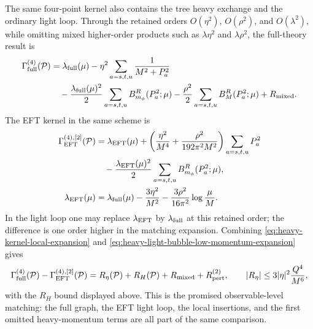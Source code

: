 The same four-point kernel also contains the tree heavy exchange and the
ordinary light loop.  Through the retained orders
\(O(\eta^2)\), \(O(\rho^2)\), and \(O(\lambda^2)\), while omitting mixed
higher-order products such as \(\lambda\eta^2\) and \(\lambda\rho^2\), the
full-theory result is
\begin{equation}
\begin{aligned}
  \Gamma_{\rm full}^{(4)}(\mathcal P)
  &=
  \lambda_{\rm full}(\mu)
  -
  \eta^2\sum_{a=s,t,u}\frac{1}{M^2+P_a^2}
  \\
  &\quad
  -
  \frac{\lambda_{\rm full}(\mu)^2}{2}
  \sum_{a=s,t,u}B_{m_\phi}^R(P_a^2;\mu)
  -
  \frac{\rho^2}{2}
  \sum_{a=s,t,u}B_M^R(P_a^2;\mu)
  +
  R_{\rm mixed}.
\end{aligned}
  \label{eq:heavy-light-full-four-point-kernel}
\end{equation}
The EFT kernel in the same scheme is
\begin{equation}
\begin{aligned}
  \Gamma_{\rm EFT}^{(4),[2]}(\mathcal P)
  &=
  \lambda_{\rm EFT}(\mu)
  +
  \left(
    \frac{\eta^2}{M^4}
    +
    \frac{\rho^2}{192\pi^2M^2}
  \right)
  \sum_{a=s,t,u}P_a^2
  \\
  &\quad
  -
  \frac{\lambda_{\rm EFT}(\mu)^2}{2}
  \sum_{a=s,t,u}B_{m_\phi}^R(P_a^2;\mu),
  \\
  \lambda_{\rm EFT}(\mu)
  &=
  \lambda_{\rm full}(\mu)
  -
  \frac{3\eta^2}{M^2}
  -
  \frac{3\rho^2}{16\pi^2}\log\frac{\mu}{M}.
\end{aligned}
  \label{eq:heavy-light-eft-four-point-kernel}
\end{equation}
In the light loop one may replace \(\lambda_{\rm EFT}\) by
\(\lambda_{\rm full}\) at this retained order; the difference is one order
higher in the matching expansion.  Combining
\eqref{eq:heavy-kernel-local-expansion} and
\eqref{eq:heavy-light-bubble-low-momentum-expansion} gives
\begin{equation}
  \Gamma_{\rm full}^{(4)}(\mathcal P)
  -
  \Gamma_{\rm EFT}^{(4),[2]}(\mathcal P)
  =
  R_\eta(\mathcal P)+R_H(\mathcal P)+R_{\rm mixed}+R_{\rm pert}^{(2)},
  \qquad
  |R_\eta|
  \le
  3|\eta|^2\frac{Q^4}{M^6},
  \label{eq:heavy-light-explicit-amplitude-remainder}
\end{equation}
with the \(R_H\) bound displayed above.  This is the promised observable-level
matching: the full graph, the EFT light loop, the local insertions, and the
first omitted heavy-momentum terms are all part of the same comparison.

